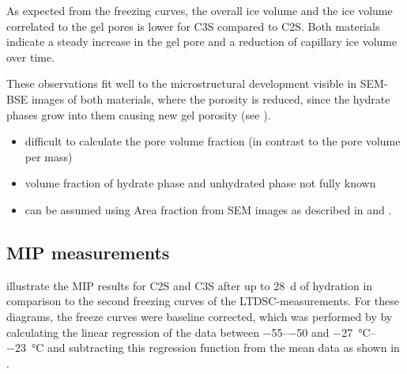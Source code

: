 As expected from the freezing curves, the overall ice volume and the ice volume correlated to the gel pores is lower for \ac{C3S} compared to \ac{C2S}.
Both materials indicate a steady increase in the gel pore and a reduction of capillary ice volume over time.

These observations fit well to the microstructural development visible in \ac{SEM}-\ac{BSE} images of both materials, where the porosity is reduced, since the hydrate phases grow into them causing new gel porosity (see ).

\begin{itemize}
	\color{red}
	\item difficult to calculate the pore volume fraction (in contrast to the pore volume per mass)
	\item volume fraction of hydrate phase and unhydrated phase not fully known
	\item can be assumed using Area fraction from SEM images as described in \cite{kleiner.2024a} and .
\end{itemize}

\FloatBarrier
\subsection{\Acl*{MIP} measurements}

 illustrate the \ac{MIP} results for \ac{C2S} and \ac{C3S} after up to \qty{28}{\day} of hydration in comparison to the second freezing curves of the \ac{LTDSC}-measurements.
For these diagrams, the freeze curves were baseline corrected, which was performed by by calculating the linear regression of the data between \numrange{-55}{-50} and \qtyrange{-27}{-23}{\celsius} and subtracting this regression function from the mean data as shown in .

